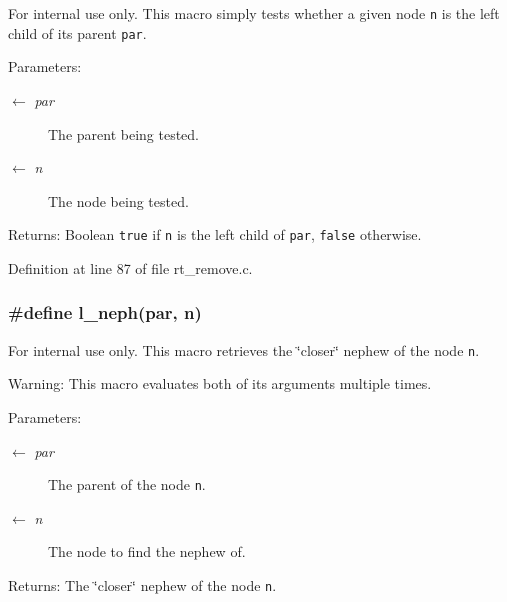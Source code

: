 \begin{Desc}
\item[For internal use only.]
This macro simply tests whether a given node {\tt n} is the left child of its parent {\tt par}.

\begin{Desc}
\item[Parameters:]
\begin{description}
\item[\mbox{$\leftarrow$} {\em par}]The parent being tested. \item[\mbox{$\leftarrow$} {\em n}]The node being tested.\end{description}
\end{Desc}
\begin{Desc}
\item[Returns:]Boolean {\tt true} if {\tt n} is the left child of {\tt par}, {\tt false} otherwise.\end{Desc}
\end{Desc}


Definition at line 87 of file rt\_\-remove.c.\hypertarget{group__dbprim__rbtree_ga50}{
\subsubsection[l\_\-neph]{\setlength{\rightskip}{0pt plus 5cm}\#define l\_\-neph(par, n)}}
\label{group__dbprim__rbtree_ga50}


\begin{Desc}
\item[For internal use only.]
This macro retrieves the \char`\"{}closer\char`\"{} nephew of the node {\tt n}.

\begin{Desc}
\item[Warning:]This macro evaluates both of its arguments multiple times.\end{Desc}
\begin{Desc}
\item[Parameters:]
\begin{description}
\item[\mbox{$\leftarrow$} {\em par}]The parent of the node {\tt n}. \item[\mbox{$\leftarrow$} {\em n}]The node to find the nephew of.\end{description}
\end{Desc}
\begin{Desc}
\item[Returns:]The \char`\"{}closer\char`\"{} nephew of the node {\tt n}.\end{Desc}
\end{Desc}


